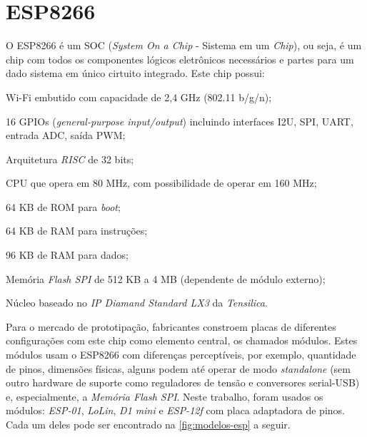 
\section{ESP8266}
\label{sec:ESP8266}

O ESP8266 é um SOC (\emph{System On a Chip} - Sistema em um \emph{Chip}),
ou seja, é um chip com todos os componentes lógicos
eletrônicos necessários e partes para um dado sistema em único cirtuito
integrado. Este chip possui:


\begin{alineas}
	\item Wi-Fi embutido com capacidade de 2,4 GHz (802.11 b/g/n);

	\item 16 GPIOs (\emph{general-purpose input/output}) incluindo interfaces
 I2U, SPI, UART, entrada ADC, saída PWM;

	\item Arquitetura \emph{RISC} de 32 bits;

	\item CPU que opera em  80 MHz, com possibilidade de operar em 160 MHz;

	\item 64 KB de ROM para \emph{boot};

	\item 64 KB de RAM para instruções;

	\item 96 KB de RAM para dados;

	\item Memória \emph{Flash SPI} de 512 KB a 4 MB (dependente de módulo externo);

	\item Núcleo baseado no \emph{IP Diamand Standard LX3} da \emph{Tensilica}.

\end{alineas}

Para o mercado de prototipação, fabricantes constroem placas de diferentes configurações com
este chip como elemento central, os chamados módulos. Estes módulos usam o
ESP8266 com diferenças perceptíveis, por exemplo, quantidade de pinos, dimensões
físicas, alguns podem até operar de modo \emph{standalone} (sem outro hardware de
suporte como reguladores de tensão e conversores serial-USB) e, especialmente, a
 \emph{Memória Flash SPI}. Neste trabalho, foram usados os módulos:
\emph{ESP-01}, \emph{LoLin}, \emph{D1 mini} e \emph{ESP-12f} com placa adaptadora de pinos.
Cada um deles pode ser encontrado na \autoref{fig:modelos-esp} a seguir.


